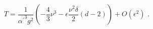 \begin{equation}
T=\frac{1}{{\alpha ^{\prime }}^{3}g^{2}}\left( -\frac{4}{3}\nu ^{3}-\epsilon
\frac{\nu ^{2}\delta }{2}(d-2)\right) +O(\epsilon ^{2})\,\,.
\end{equation}

